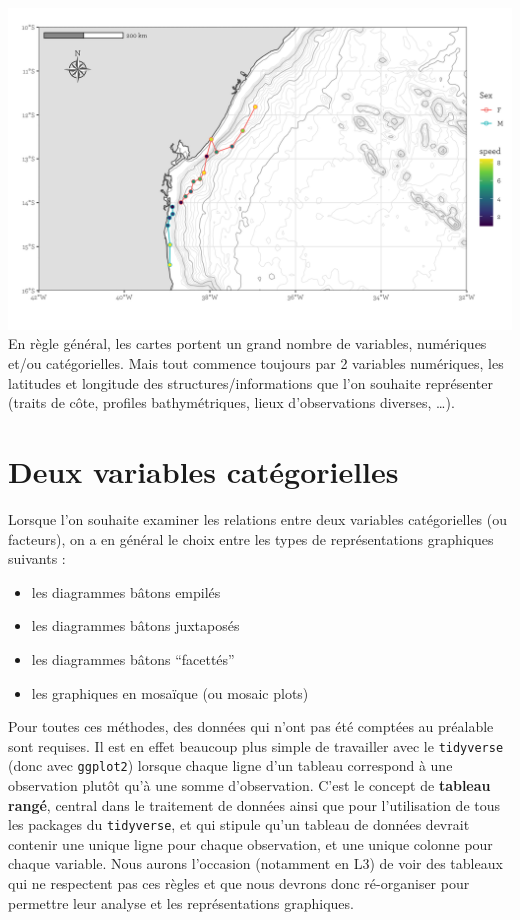 \documentclass[
  letterpaper,
  DIV=11,
  numbers=noendperiod]{scrreprt}
\providecommand{\tightlist}{%
  \setlength{\itemsep}{0pt}\setlength{\parskip}{0pt}}\usepackage{longtable,booktabs,array}
\begin{document}
\includegraphics{./images/map.png} En règle général, les cartes portent
un grand nombre de variables, numériques et/ou catégorielles. Mais tout
commence toujours par 2 variables numériques, les latitudes et longitude
des structures/informations que l'on souhaite représenter (traits de
côte, profiles bathymétriques, lieux d'observations diverses, \ldots).

\hypertarget{deux-variables-catuxe9gorielles}{%
\section{Deux variables
catégorielles}\label{deux-variables-catuxe9gorielles}}

Lorsque l'on souhaite examiner les relations entre deux variables
catégorielles (ou facteurs), on a en général le choix entre les types de
représentations graphiques suivants :

\begin{itemize}
\tightlist
\item
  les diagrammes bâtons empilés
\item
  les diagrammes bâtons juxtaposés
\item
  les diagrammes bâtons ``facettés''
\item
  les graphiques en mosaïque (ou mosaic plots)
\end{itemize}

Pour toutes ces méthodes, des données qui n'ont pas été comptées au
préalable sont requises. Il est en effet beaucoup plus simple de
travailler avec le \texttt{tidyverse} (donc avec \texttt{ggplot2})
lorsque chaque ligne d'un tableau correspond à une observation plutôt
qu'à une somme d'observation. C'est le concept de \textbf{tableau
rangé}, central dans le traitement de données ainsi que pour
l'utilisation de tous les packages du \texttt{tidyverse}, et qui stipule
qu'un tableau de données devrait contenir une unique ligne pour chaque
observation, et une unique colonne pour chaque variable. Nous aurons
l'occasion (notamment en L3) de voir des tableaux qui ne respectent pas
ces règles et que nous devrons donc ré-organiser pour permettre leur
analyse et les représentations graphiques.
\end{document}
